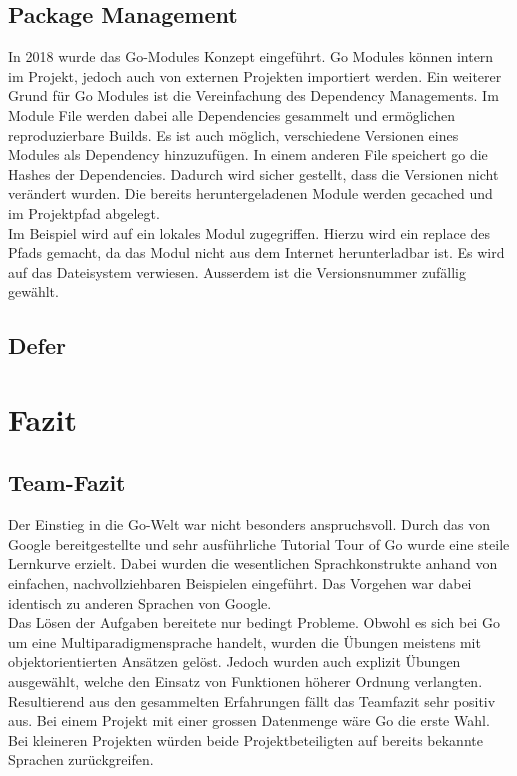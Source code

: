 \documentclass[12pt,titlepage]{article}
\begin{document}
\subsection{Package Management}
In 2018 wurde das Go-Modules Konzept eingeführt. Go Modules können intern im Projekt, jedoch auch von externen Projekten importiert werden. Ein weiterer Grund für Go Modules ist die Vereinfachung des Dependency Managements. Im Module File werden dabei alle Dependencies gesammelt und ermöglichen reproduzierbare Builds. Es ist auch möglich, verschiedene Versionen eines Modules als Dependency hinzuzufügen. In einem anderen File speichert go die Hashes der Dependencies. Dadurch wird sicher gestellt, dass die Versionen nicht verändert wurden. Die bereits heruntergeladenen Module werden gecached und im Projektpfad abgelegt. \\
Im Beispiel wird auf ein lokales Modul zugegriffen. Hierzu wird ein replace des Pfads gemacht, da das Modul nicht aus dem Internet herunterladbar ist. Es wird auf das Dateisystem verwiesen. Ausserdem ist die Versionsnummer zufällig gewählt. 

\subsection{Defer}


\section{Fazit}
\subsection{Team-Fazit}
Der Einstieg in die Go-Welt war nicht besonders anspruchsvoll. Durch das von Google bereitgestellte und sehr ausführliche Tutorial Tour of Go wurde eine steile Lernkurve erzielt. Dabei wurden die wesentlichen Sprachkonstrukte anhand von einfachen, nachvollziehbaren Beispielen eingeführt. Das Vorgehen war dabei identisch zu anderen Sprachen von Google. \\Das Lösen der Aufgaben bereitete nur bedingt Probleme. Obwohl es sich bei Go um eine Multiparadigmensprache handelt, wurden die Übungen meistens mit objektorientierten Ansätzen gelöst. Jedoch wurden auch explizit Übungen ausgewählt, welche den Einsatz von Funktionen höherer Ordnung verlangten. \\
Resultierend aus den gesammelten Erfahrungen fällt das Teamfazit sehr positiv aus. Bei einem Projekt mit einer grossen Datenmenge wäre Go die erste Wahl. Bei kleineren Projekten würden beide Projektbeteiligten auf bereits bekannte Sprachen zurückgreifen.
\end{document}
